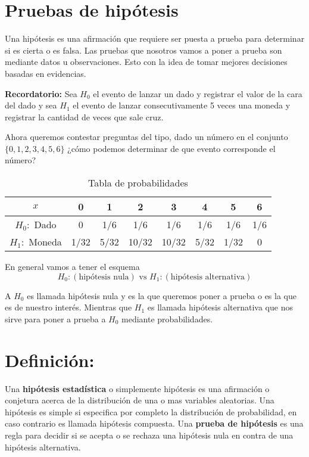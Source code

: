 \documentclass{assignment}
\begin{document}
\section{Pruebas de hipótesis}
Una hipótesis es una afirmación que requiere ser puesta a prueba para determinar si es cierta o es falsa. Las pruebas que nosotros vamos a poner a prueba son mediante datos u observaciones. Esto con la idea de tomar mejores decisiones basadas en evidencias. 

\textbf{Recordatorio:} Sea $H_0$ el evento de lanzar un dado y registrar el valor de la cara del dado y sea $H_1$ el evento de lanzar consecutivamente 5 veces una moneda y registrar la cantidad de veces que sale cruz. 

Ahora queremos contestar preguntas del tipo, dado un número en el conjunto $\{0,1,2,3,4,5,6\}$ ¿cómo podemos determinar de que evento corresponde el número?


\begin{table}[h]
    \centering
    \begin{tabular}{|c|c|c|c|c|c|c|c|}
    \hline
       $x$  & 0 & 1 & 2 & 3 & 4 & 5 & 6   \\
       \hline
        $H_0:$ Dado  & 0  & 1/6 & 1/6 & 1/6 &1/6  & 1/6 & 1/6   \\ 
        \hline
        $H_1:$ Moneda  & 1/32 & 5/32 & 10/32 & 10/32 & 5/32 & 1/32 &  0 \\ 
        \hline
    \end{tabular}
    \caption{Tabla de probabilidades}

\end{table}

En general vamos a tener el esquema
\[
H_0: (\text{hipótesis nula}) \text{ vs } H_1: (\text{hipótesis alternativa})
\]

A $H_0$ es llamada hipótesis nula y es la que queremos poner a prueba o es la que es de nuestro interés. Mientras que $H_1$ es llamada hipótesis alternativa que nos sirve para poner a prueba a $H_0$ mediante probabilidades. 

\section{Definición:}
Una \textbf{hipótesis estadística} o simplemente hipótesis es una afirmación o conjetura acerca de la distribución de una o mas variables aleatorias. Una hipótesis es simple si especifica por completo la distribución de probabilidad, en caso contrario es llamada hipótesis compuesta. Una \textbf{prueba de hipótesis} es una regla para decidir si se acepta o se rechaza una hipótesis nula en contra de una hipótesis alternativa.  
\end{document}
